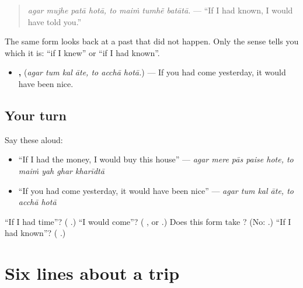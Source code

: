 \begin{quote}
\emph{agar mujhe patā hotā, to maiṁ tumhẽ batātā.} — \textquotedblleft{}If I had known, I would have told you.\textquotedblright{}
\end{quote}

The same form looks back at a past that did not happen. Only the sense tells you which it is: \textquotedblleft{}if I knew\textquotedblright{} or \textquotedblleft{}if I had known\textquotedblright{}.

\begin{itemize}
\raggedright
  \item \textbf{   ,   } (\emph{agar tum kal āte, to acchā hotā.}) — If you had come yesterday, it would have been nice.
\end{itemize}

\subsection*{Your turn}
Say these aloud:

\begin{itemize}
\raggedright
  \item \textquotedblleft{}If I had the money, I would buy this house\textquotedblright{} — \emph{agar mere pās paise hote, to maiṁ yah ghar kharīdtā}
  \item \textquotedblleft{}If you had come yesterday, it would have been nice\textquotedblright{} — \emph{agar tum kal āte, to acchā hotā}
\end{itemize}

\begin{tcolorbox}[breakable,colback=teal!4,colframe=teal!35!black,title={Before you move on}]
\textquotedblleft{}If I had time\textquotedblright{}? (\textbf{    }.) \textquotedblleft{}I would come\textquotedblright{}? (\textbf{ }, or \textbf{}.) Does this form take \textbf{}? (No: \textbf{  }.) \textquotedblleft{}If I had known\textquotedblright{}? (\textbf{   }.)
\end{tcolorbox}
\section[(six lines)]{Six lines about a trip}

\label{lesson:HI-W287-six-lines}



